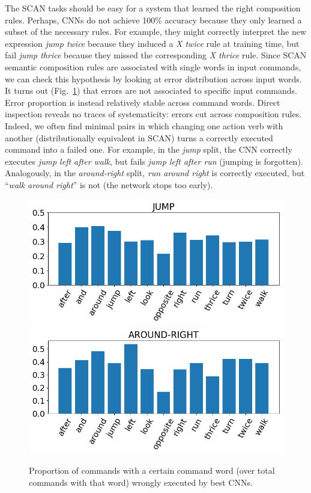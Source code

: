 The SCAN tasks should be easy for a system that learned the right
composition rules. Perhaps, CNNs do not achieve 100\% accuracy because
they only learned a subset of the necessary rules. For example, they
might correctly interpret the new expression \emph{jump twice} because
they induced a \emph{X twice} rule at training time, but fail
\emph{jump thrice} because they missed the corresponding \emph{X
  thrice} rule. Since SCAN semantic composition rules are associated
with single words in input commands, we can check this hypothesis by
looking at error distribution across input words. It turns
out (Fig.~\ref{fig:error_distributions}) that errors are not
associated to specific input commands. Error proportion is instead relatively
stable across command words. Direct inspection reveals no traces of
systematicity: errors cut across composition rules. Indeed, we
often find minimal pairs in which changing one action verb with
another (distributionally equivalent in SCAN) turns a correctly
executed command into a failed one. For example, in the \emph{jump}
split, the CNN correctly executes \emph{jump left after walk}, but
fails \emph{jump left after run} (jumping is
forgotten). Analogously, in the \emph{around-right} split, \emph{run
  around right} is correctly executed, but ``\emph{walk around
  right}'' is not (the network stops too early).
\begin{figure}[tb]
    \centering
    \includegraphics[width=.45\textwidth,keepaspectratio]{figures/jump_error_dist.png}
    \includegraphics[width=.45\textwidth,keepaspectratio]{figures/template_error_dist.png}
    \caption{Proportion of commands with a certain command word (over total commands with that word) wrongly executed by best CNNs.}
    \label{fig:error_distributions}
\end{figure}
